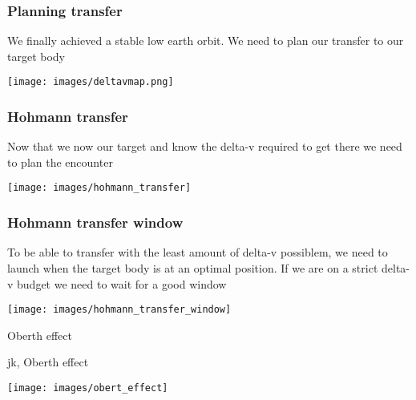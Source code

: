 \begin{frame}
    \frametitle{Planning transfer}
    \begin{block}{}
        We finally achieved a stable low earth orbit. We need to plan our transfer to our target body
    \end{block}
\end{frame}
\begin{frame}
    \begin{center}
        \texttt{[image: images/deltavmap.png]}
    \end{center}
\end{frame}
\begin{frame}
    \frametitle{Hohmann transfer}
    \begin{block}{}
        Now that we now our target and know the delta-v required to get there we need to plan the encounter
    \end{block}
    \begin{block}{}
        \begin{center}
            \texttt{[image: images/hohmann\_transfer]}
        \end{center}
    \end{block}
\end{frame}
\begin{frame}
    \frametitle{Hohmann transfer window}
    \begin{block}{}
        To be able to transfer with the least amount of delta-v possiblem, we need to launch when the target body is
        at an optimal position. If we are on a strict delta-v budget we need to wait for a good window
    \end{block}
    \begin{block}{}
        \begin{center}
            \texttt{[image: images/hohmann\_transfer\_window]}
        \end{center}
    \end{block}
\end{frame}
{
%
\begin{frame}[t]{Oberth effect}
\end{frame}
}
\begin{frame}[t]{jk, Oberth effect}
    \begin{block}{}
        \texttt{[image: images/obert\_effect]}
    \end{block}
\end{frame}
